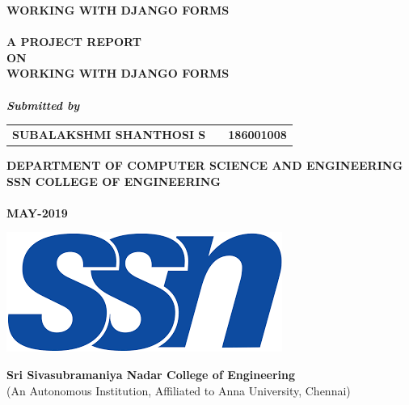 \newpage
\begin{center}
\vspace{5cm}
\thispagestyle{empty}
{\selectfont
\Large{\textsc {\textbf{WORKING WITH DJANGO FORMS}}}}\\
\Large{\textbf{\\A PROJECT REPORT\\ ON}} \\[0.3cm]
{\selectfont
\Large{\textsc {\textbf{WORKING WITH DJANGO FORMS}}}}\\

\Large{\textit{\textbf{\\Submitted by}}}

\vspace{1cm}
\begin{table}[h]
	\centering
	\Large{
		\begin{tabular}{>{\bfseries}lc>{\bfseries}r}
			SUBALAKSHMI SHANTHOSI S & & 186001008 \\
	\end{tabular}}
\end{table}
\vspace{0.5cm}
{\selectfont
\large{\textbf{DEPARTMENT OF COMPUTER SCIENCE AND ENGINEERING}}}\\
\vspace*{0.5cm}
\Large{\textbf{SSN COLLEGE OF ENGINEERING}}\\
\large{\textbf{\\MAY-2019}}\\
\vspace{10cm}

\includegraphics[scale=0.35]{ssnLogoNew.png}

\Large{\textbf{Sri Sivasubramaniya Nadar College of Engineering\\}}
{(An Autonomous Institution, Affiliated to Anna University, Chennai)}\\
\end{center}